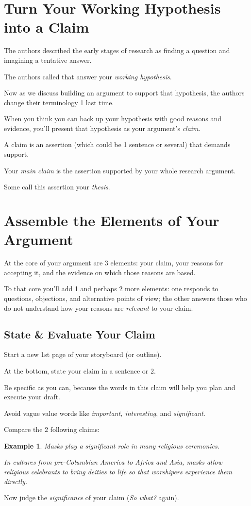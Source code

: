 \documentclass[oneside]{book}
\numberwithin{equation}{section}
\newtheorem{example}{Example}[section]
\begin{document}
\section{Turn Your Working Hypothesis into a Claim}
The authors described the early stages of research as finding a question and imagining a tentative answer.

The authors called that answer your \textit{working hypothesis}.

Now as we discuss building an argument to support that hypothesis, the authors change their terminology 1 last time.

When you think you can back up your hypothesis with good reasons and evidence, you'll present that hypothesis as your argument's \textit{claim}.

A claim is an assertion (which could be 1 sentence or several) that demands support.

Your \textit{main claim} is the assertion supported by your whole research argument.

Some call this assertion your \textit{thesis}.

\section{Assemble the Elements of Your Argument}
At the core of your argument are 3 elements: your claim, your reasons for accepting it, and the evidence on which those reasons are based.

To that core you'll add 1 and perhaps 2 more elements: one responds to questions, objections, and alternative points of view; the other answers those who do not understand how your reasons are \textit{relevant} to your claim.

\subsection{State \& Evaluate Your Claim}
Start a new 1st page of your storyboard (or outline).

At the bottom, state your claim in a sentence or 2.

Be specific as you can, because the words in this claim will help you plan and execute your draft.

Avoid vague value words like \textit{important, interesting}, and \textit{significant}.

Compare the 2 following claims:
\begin{example}
    Masks play a significant role in many religious ceremonies.
    
    In cultures from pre-Columbian America to Africa and Asia, masks allow religious celebrants to bring deities to life so that worshipers experience them directly.
\end{example}
Now judge the \textit{significance} of your claim (\textit{So what?} again).
\end{document}
